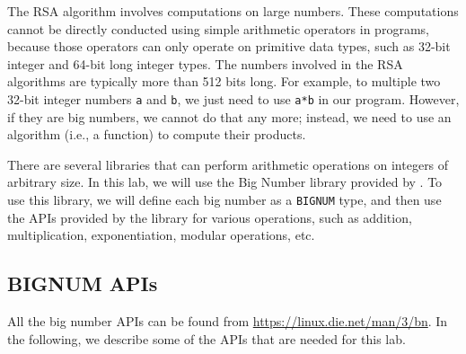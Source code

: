 The RSA algorithm involves computations on large numbers. These computations 
cannot be directly conducted using simple arithmetic operators in programs, because those
operators can only operate on primitive data types, such as 32-bit integer and 64-bit long
integer types. The numbers involved in the RSA algorithms are typically more than 512 bits
long. For example, to multiple two 32-bit integer numbers \texttt{a} and \texttt{b},
we just need to use \texttt{a*b} in our program. However, if they are big numbers, we cannot
do that any more; instead, we need to use an algorithm (i.e., a function) to compute 
their products. 


There are several libraries that can perform arithmetic operations on integers of 
arbitrary size. In this lab, we will use the Big Number library provided 
by \openssl. To use this library, we will define each big number as 
a \texttt{BIGNUM} type, and then use the APIs provided by the library
for various operations, such as addition, multiplication, exponentiation, 
modular operations, etc. 



\subsection{BIGNUM APIs}

All the big number APIs can be found from 
\url{https://linux.die.net/man/3/bn}. In the following, 
we describe some of the APIs that are needed for this lab.



